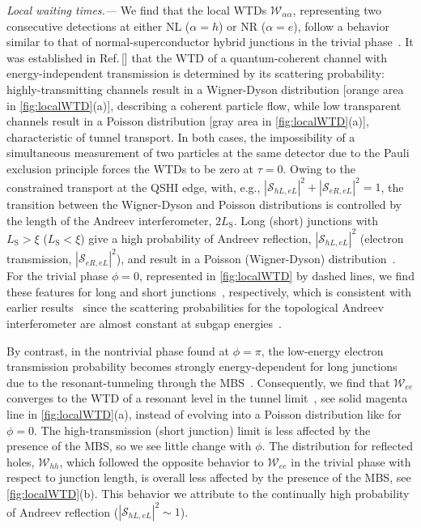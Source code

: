 \documentclass[aps,prl,amsmath,twocolumn,floatfix,superscriptaddress,longbibliography,footinbib]{revtex4-1}
\begin{document}
\textit{Local waiting times.---} 
We find that the local WTDs $\mathcal{W}_{\alpha\alpha}$, representing two consecutive detections at either NL ($\alpha=h$) or NR ($\alpha=e$), follow a behavior similar to that of normal-superconductor hybrid junctions in the trivial phase~\cite{Chevallier2016,Mi2018,Schulz2022}. It was established in Ref.\,[] that the WTD of a quantum-coherent channel with energy-independent transmission is determined by its scattering probability: highly-transmitting channels result in a Wigner-Dyson distribution [orange area in \cref{fig:localWTD}(a)], describing a coherent particle flow, while low transparent channels result in a Poisson distribution [gray area in \cref{fig:localWTD}(a)], characteristic of tunnel transport. In both cases, the impossibility of a simultaneous measurement of two particles at the same detector due to the Pauli exclusion principle forces the WTDs to be zero at $\tau=0$. 
Owing to the constrained transport at the QSHI edge, with, e.g., $|\mathcal{S}_{hL,eL}|^2+|\mathcal{S}_{eR,eL}|^2=1$, the transition between the Wigner-Dyson and Poisson distributions is controlled by the length of the Andreev interferometer, $2L_\text{S}$. Long (short) junctions with $L_\text{S}>\xi$ ($L_\text{S}<\xi$) give a high probability of Andreev reflection, $|\mathcal{S}_{hL,eL}|^2$ (electron transmission, $|\mathcal{S}_{eR,eL}|^2$), and result in a Poisson (Wigner-Dyson) distribution~\cite{SM}. For the trivial phase $\phi=0$, represented in \cref{fig:localWTD} by dashed lines, we find these features for long and short junctions~\footnotemark[2], respectively, which is consistent with earlier results~\cite{Haack2014,Mi2018,Schulz2022} since the scattering probabilities for the topological Andreev interferometer are almost constant at subgap energies~\cite{SM}. 

By contrast, in the nontrivial phase found at $\phi=\pi$, the low-energy electron transmission probability becomes strongly energy-dependent for long junctions due to the resonant-tunneling through the MBS~\cite{SM,Cayao2022}. Consequently, we find that $\mathcal{W}_{ee}$ converges to the WTD of a resonant level in the tunnel limit~\cite{Haack2014}, see solid magenta line in \cref{fig:localWTD}(a), instead of evolving into a Poisson distribution like for $\phi=0$. The high-transmission (short junction) limit is less affected by the presence of the MBS, so we see little change with $\phi$. The distribution for reflected holes, $\mathcal{W}_{hh}$, which followed the opposite behavior to $\mathcal{W}_{ee}$ in the trivial phase with respect to junction length, is overall less affected by the presence of the MBS, see \cref{fig:localWTD}(b). This behavior we attribute to the continually high probability of Andreev reflection ($|\mathcal{S}_{hL,eL}|^2\sim1$). 
\end{document}
